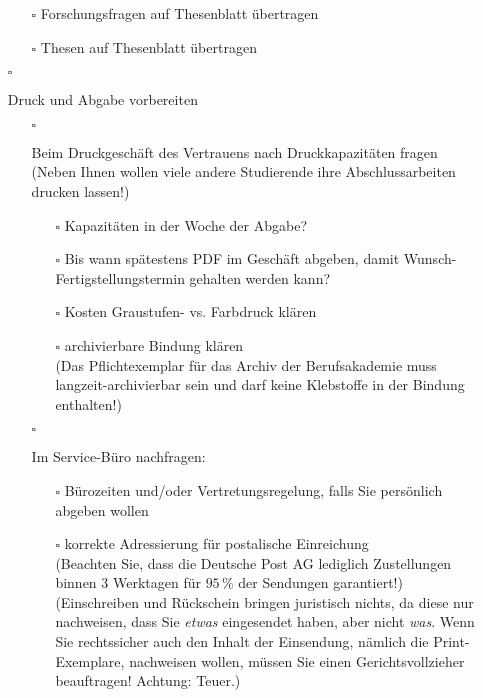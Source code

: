 \begin{itemize}
{\begin{itemize}
{\begin{itemize}
                    \item[$\square$] Forschungsfragen auf Thesenblatt übertragen
                    \item[$\square$] Thesen auf Thesenblatt übertragen
                \end{itemize}
            }
        \end{itemize}
    }
\clearpage
    \item[$\square$]{
        Druck und Abgabe vorbereiten
        \begin{itemize}
             \item[$\square$]{
                Beim Druckgeschäft des Vertrauens nach Druckkapazitäten fragen\\
                (Neben Ihnen wollen viele andere Studierende ihre Abschlussarbeiten drucken lassen!)
                \begin{itemize}
                    \item[$\square$] Kapazitäten in der Woche der Abgabe?
                    \item[$\square$] Bis wann spätestens PDF im Geschäft abgeben, damit Wunsch-Fertigstellungstermin gehalten werden kann?
                    \item[$\square$] Kosten Graustufen- vs. Farbdruck klären
                    \item[$\square$]{
                        archivierbare Bindung klären\\
                        (Das Pflichtexemplar für das Archiv der Berufsakademie muss langzeit-archivierbar sein und darf keine Klebstoffe in der Bindung enthalten!)
                    }
                \end{itemize}
            }
            \item[$\square$]{
                Im Service-Büro nachfragen:
                \begin{itemize}
                    \item[$\square$] Bürozeiten und/oder Vertretungsregelung, falls Sie persönlich abgeben wollen
                    \item[$\square$]{
                        korrekte Adressierung für postalische Einreichung\\
                        (Beachten Sie, dass die Deutsche Post AG lediglich Zustellungen binnen $3$ Werktagen für $95\,\%$ der Sendungen garantiert!)\\
                        (Einschreiben und Rückschein bringen juristisch nichts, da diese nur nachweisen, dass Sie \emph{etwas} eingesendet haben, aber nicht \emph{was}. Wenn Sie rechtssicher auch den Inhalt der Einsendung, nämlich die Print-Exemplare, nachweisen wollen, müssen Sie einen Gerichtsvollzieher beauftragen! Achtung: Teuer.)
}
\end{itemize}}
\end{itemize}}
\end{itemize}
